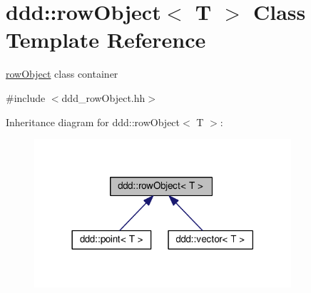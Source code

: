\hypertarget{classddd_1_1row_object}{}\section{ddd\+:\+:row\+Object$<$ T $>$ Class Template Reference}
\label{classddd_1_1row_object}


\hyperlink{classddd_1_1row_object}{row\+Object} class container  




{\ttfamily \#include $<$ddd\+\_\+row\+Object.\+hh$>$}



Inheritance diagram for ddd\+:\+:row\+Object$<$ T $>$\+:\nopagebreak
\begin{figure}[H]
\begin{center}
\leavevmode
\includegraphics[width=270pt]{df/da8/classddd_1_1row_object__inherit__graph}
\end{center}
\end{figure}
